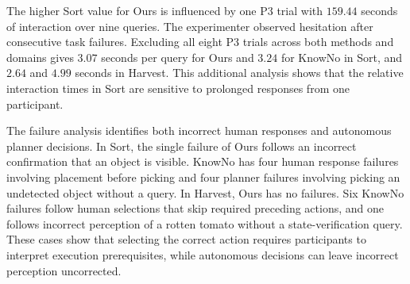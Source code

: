 The higher Sort value for Ours is influenced by one P3 trial with $159.44$ seconds of interaction over nine queries. The experimenter observed hesitation after consecutive task failures. Excluding all eight P3 trials across both methods and domains gives $3.07$ seconds per query for Ours and $3.24$ for KnowNo in Sort, and $2.64$ and $4.99$ seconds in Harvest. This additional analysis shows that the relative interaction times in Sort are sensitive to prolonged responses from one participant.


The failure analysis identifies both incorrect human responses and autonomous planner decisions. In Sort, the single failure of Ours follows an incorrect confirmation that an object is visible. KnowNo has four human response failures involving placement before picking and four planner failures involving picking an undetected object without a query. In Harvest, Ours has no failures. Six KnowNo failures follow human selections that skip required preceding actions, and one follows incorrect perception of a rotten tomato without a state-verification query. These cases show that selecting the correct action requires participants to interpret execution prerequisites, while autonomous decisions can leave incorrect perception uncorrected.





